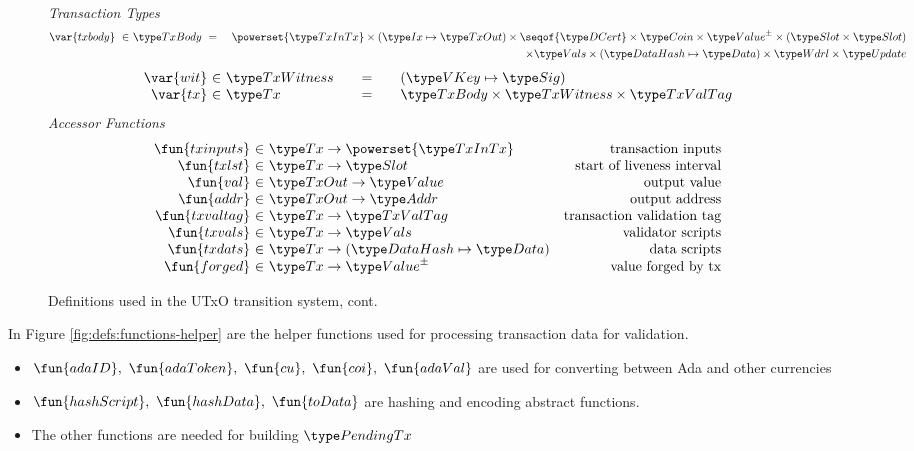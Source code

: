 \begin{figure*}[htb]
  \emph{Transaction Types}
  \begin{align*}
    \var{txbody} ~\in~
    & \TxBody ~=~
    & \powerset{\TxInTx} \times (\Ix \mapsto \TxOut) \times \seqof{\DCert}
      \times \Coin \times \ValuePM \times (\Slot\times\Slot) \\
    &~& \times \Vals \times (\HashDat \mapsto \Data)
    \times \Wdrl \times \Update
  \end{align*}
  \begin{equation*}
    \begin{array}{r@{~\in~}l@{\qquad=\qquad}l}
      \var{wit} & \TxWitness & (\VKey \mapsto \Sig)
      \\
      \var{tx}
      & \Tx
      & \TxBody \times \TxWitness \times \TxValTag
    \end{array}
  \end{equation*}
  \emph{Accessor Functions}
  \begin{equation*}
    \begin{array}{r@{~\in~}lr}
      \fun{txinputs} & \Tx \to \powerset{\TxInTx} & \text{transaction inputs} \\
      \fun{txlst} & \Tx \to \Slot & \text{start of liveness interval} \\
      \fun{val} & \TxOut \to \Value & \text{output value} \\
      \fun{addr} & \TxOut \to \Addr & \text{output address} \\
      \fun{txvaltag} & \Tx \to \TxValTag & \text{transaction validation tag}\\
      \fun{txvals} & \Tx \to \Vals & \text{validator scripts}\\
      \fun{txdats} & \Tx \to (\HashDat \mapsto \Data) & \text{data scripts}\\
      \fun{forged} & \Tx \to \ValuePM & \text{value forged by tx}\\
    \end{array}
  \end{equation*}
  \caption{Definitions used in the UTxO transition system, cont.}
  \label{fig:defs:utxo-shelley-2}
\end{figure*}


In Figure \ref{fig:defs:functions-helper} are the helper functions used for
processing transaction data for validation.

\begin{itemize}
  \item $\fun{adaID},~\fun{adaToken},~\fun{cu},~\fun{coi},~\fun{adaVal}$ are used
  for converting between Ada and other currencies
  \item $\fun{hashScript},~ \fun{hashData},~\fun{toData}$ are hashing and encoding
  abstract functions.
  \item The other functions are needed for building $\PendingTx$
\end{itemize}

